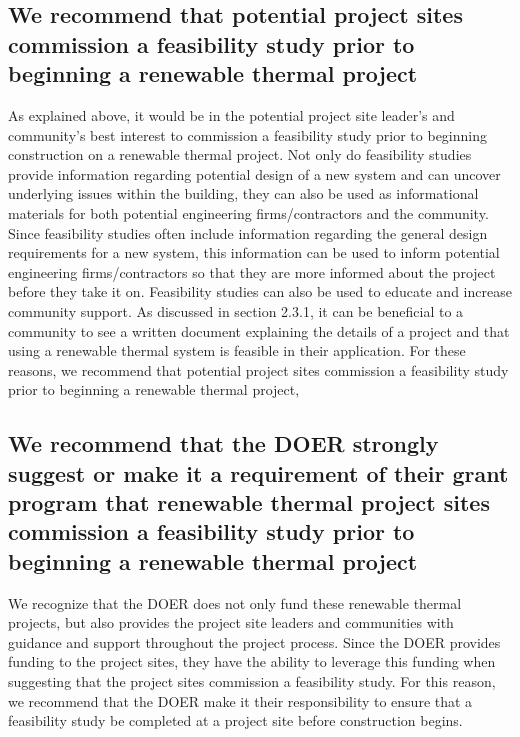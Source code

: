 \subsection{We recommend that potential project sites commission a feasibility study prior to beginning a renewable thermal project}
\par As explained above, it would be in the potential project site leader’s and community’s best interest to commission a feasibility study prior to beginning construction on a renewable thermal project. Not only do feasibility studies provide information regarding potential design of a new system and can uncover underlying issues within the building, they can also be used as informational materials for both potential engineering firms/contractors and the community. Since feasibility studies often include information regarding the general design requirements for a new system, this information can be used to inform potential engineering firms/contractors so that they are more informed about the project before they take it on. Feasibility studies can also be used to educate and increase community support. As discussed in section 2.3.1, it can be beneficial to a community to see a written document explaining the details of a project and that using a renewable thermal system is feasible in their application. For these reasons, we recommend that potential project sites commission a feasibility study prior to beginning a renewable thermal project,

\subsection{We recommend that the DOER strongly suggest or make it a requirement of their grant program that renewable thermal project sites commission a feasibility study prior to beginning a renewable thermal project}
\par We recognize that the DOER does not only fund these renewable thermal projects, but also provides the project site leaders and communities with guidance and support throughout the project process. Since the DOER provides funding to the project sites, they have the ability to leverage this funding when suggesting that the project sites commission a feasibility study. For this reason, we recommend that the DOER make it their responsibility to ensure that a feasibility study be completed at a project site before construction begins.

